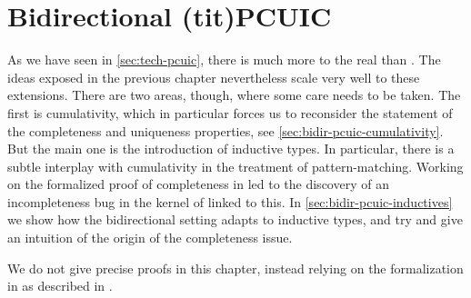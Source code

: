 \chapter{Bidirectional \kl(tit){PCUIC}}
\label{chap:bidir-pcuic}

\margintoc

As we have seen in \cref{sec:tech-pcuic}, there is much more to the real  than
.
The ideas exposed in the previous chapter nevertheless
scale very well to these extensions.
There are two areas, though, where some care needs to be taken.
The first is cumulativity, which in particular forces us to reconsider the statement
of the completeness and uniqueness properties, see \cref{sec:bidir-pcuic-cumulativity}.
But the main one is the introduction of inductive types. In particular, there is a subtle
interplay with cumulativity in the treatment of pattern-matching.
Working on the formalized proof of completeness in  led to the discovery of
an incompleteness bug in the kernel of  linked to this.
In \cref{sec:bidir-pcuic-inductives} we show how the bidirectional setting adapts to
inductive types, and try and give an intuition of the origin of the completeness issue.

We do not give precise proofs in this chapter,
instead relying on the formalization in  as described in .


  
